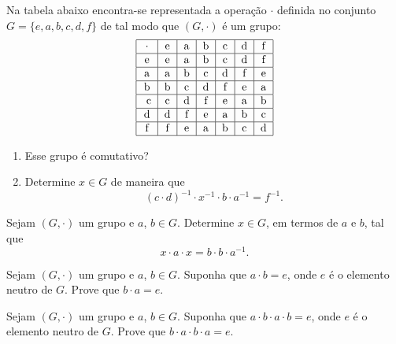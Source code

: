 \documentclass[12pt]{exam}
\begin{document}
    \questao{} Na tabela abaixo encontra-se representada a opera\c{c}\~ao $\cdot$ definida no conjunto $G = \{e, a , b, c, d, f\}$ de tal modo que $(G, \cdot)$ \'e um grupo:
    \[
        \begin{tabular}{|c|c|c|c|c|c|c|c|}
            \hline
            $\cdot$ & e & a & b & c & d & f\\
            \hline
            e & e & a & b & c & d & f\\
            \hline
            a & a & b & c & d & f & e\\
            \hline
            b & b & c & d & f & e & a\\
            \hline\
            c & c & d & f & e & a & b\\
            \hline
            d & d & f & e & a & b & c\\
            \hline
            f & f & e & a & b & c & d\\
            \hline
        \end{tabular}
    \]
    \begin{enumerate}[label=({\alph*})]
        \item Esse grupo \'e comutativo?

        \item Determine $x \in G$ de maneira que
        \[
            (c \cdot d)^{-1}\cdot x^{-1} \cdot b  \cdot a^{-1} = f^{-1}.
        \]
    \end{enumerate}

    \vspace{.3cm}

    \questao{} Sejam $(G, \cdot)$ um grupo e $a$, $b \in G$. Determine $x \in G$, em termos de $a$ e $b$, tal que
    \[
        x\cdot a \cdot x = b \cdot b \cdot a^{-1}.
    \]

    \vspace{.3cm}

    \questao{} Sejam $(G, \cdot)$ um grupo e $a$, $b \in G$. Suponha que $a \cdot b = e$, onde $e$ \'e o elemento neutro de $G$. Prove que $b \cdot a = e$.

    \vspace{.3cm}

    \questao{} Sejam $(G, \cdot)$ um grupo e $a$, $b \in G$. Suponha que $a \cdot b \cdot a \cdot b = e$, onde $e$ \'e o elemento neutro de $G$. Prove que $b \cdot a \cdot b \cdot a= e$.
\end{document}
